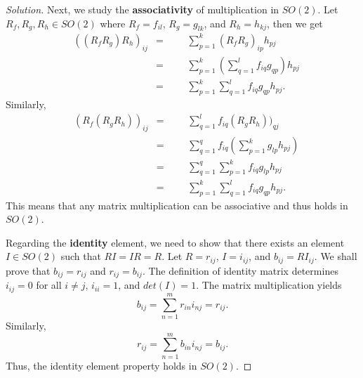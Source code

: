 \documentclass[12pt]{article}
\newenvironment{solution}{\begin{proof}[Solution]}{\end{proof}}
\begin{document}
\begin{solution}
Next, we study the \textbf{associativity} of multiplication in $SO(2)$. Let $R_f, R_g, R_h \in SO(2)$ where $R_f=f_{il}$, $R_g=g_{lk}$, and $R_h=h_{kj}$, then we get
\begin{equation*}
\begin{aligned}
& ((R_f R_g) R_h)_{ij}
&  =
&&& \sum_{p=1}^k (R_f R_g)_{ip}h_{pj}\\
&& =
&&& \sum_{p=1}^k (\sum_{q=1}^l f_{iq}g_{qp})h_{pj}\\ 
&& =
&&&  \sum_{p=1}^k \sum_{q=1}^l f_{iq}g_{qp}h_{pj}.
\end{aligned}
\end{equation*}
Similarly,
\begin{equation*}
\begin{aligned}
& (R_f (R_g R_h))_{ij}
&  =
&&& \sum_{q=1}^l f_{iq}(R_g R_h))_{qj}\\
&& =
&&& \sum_{q=1}^q f_{iq}(\sum_{p=1}^k g_{lp}h_{pj})\\ 
&& =
&&&  \sum_{q=1}^q \sum_{p=1}^k f_{iq}g_{lp}h_{pj}\\
&& =
&&&  \sum_{p=1}^k \sum_{q=1}^l f_{iq}g_{qp}h_{pj}.
\end{aligned}
\end{equation*}
This means that any matrix multiplication can be associative and thus holds in $SO(2)$.

Regarding  the \textbf{identity} element, we need to show that there exists an element $I \in SO(2)$ such that $RI=IR=R$. Let $R=r_{ij}$, $I=i_{ij}$, and $b_{ij}=RI_{ij}$. We shall prove that $b_{ij}=r_{ij}$ and $r_{ij}=b_{ij}$. The definition of identity matrix determines $i_{ij}=0$ for all $i \neq j$, $i_{ii}=1$, and $det(I)=1$. The matrix multiplication yields
\begin{equation*}
b_{ij}= \sum_{n=1}^m r_{in} i_{nj}=r_{ij}.
\end{equation*}
Similarly,
\begin{equation*}
r_{ij}= \sum_{n=1}^m b_{in} i_{nj}=b_{ij}.
\end{equation*}
Thus, the identity element property holds in $SO(2)$. 


\end{solution}
\end{document}

